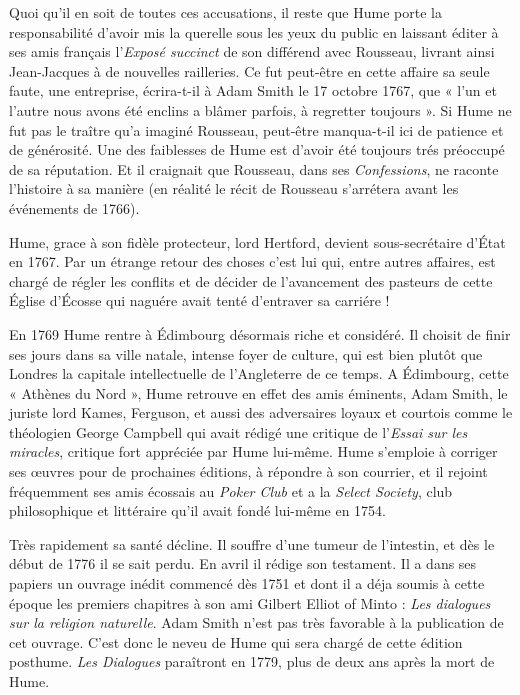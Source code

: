 Quoi qu’il en soit de toutes ces accusations, il
reste que Hume porte la responsabilité d’avoir mis
la querelle sous les yeux du public en laissant éditer
à ses amis français l’{\it Exposé succinct} de son différend
avec Rousseau, livrant ainsi Jean-Jacques à de
nouvelles railleries. Ce fut peut-être en cette affaire
sa seule faute, une entreprise, écrira-t-il à Adam
Smith le 17 octobre 1767, que « l’un et l’autre nous
avons été enclins a blâmer parfois, à regretter
toujours ». Si Hume ne fut pas le traître qu’a imaginé
Rousseau, peut-être manqua-t-il ici de patience et
de générosité. Une des faiblesses de Hume est d’avoir
été toujours trés préoccupé de sa réputation. Et
il craignait que Rousseau, dans ses {\it Confessions}, ne
raconte l'histoire à sa manière (en réalité le récit de
Rousseau s’arrétera avant les événements de 1766).

Hume, grace à son fidèle protecteur, lord Hertford,
devient sous-secrétaire d’État en 1767. Par un
étrange retour des choses c’est lui qui, entre autres
affaires, est chargé de régler les conflits et de décider
de l’avancement des pasteurs de cette Église
d’Écosse qui naguére avait tenté d’entraver sa
carriére !

En 1769 Hume rentre à Édimbourg désormais
riche et considéré. Il choisit de finir ses jours dans
sa ville natale, intense foyer de culture, qui est bien
plutôt que Londres la capitale intellectuelle de
l’Angleterre de ce temps. A Édimbourg, cette
« Athènes du Nord », Hume retrouve en effet des
amis éminents, Adam Smith, le juriste lord Kames,
Ferguson, et aussi des adversaires loyaux et courtois
comme le théologien George Campbell qui avait
rédigé une critique de l’{\it Essai sur les miracles}, critique
fort appréciée par Hume lui-même. Hume
s’emploie à corriger ses {\oe}uvres pour de prochaines
éditions, à répondre à son courrier, et il rejoint
fréquemment ses amis écossais au {\it Poker Club} et a
la {\it Select Society}, club philosophique et littéraire
qu’il avait fondé lui-même en 1754.

Très rapidement sa santé décline. Il souffre d’une
tumeur de l'intestin, et dès le début de 1776 il se
sait perdu. En avril il rédige son testament. Il a
dans ses papiers un ouvrage inédit commencé
dès 1751 et dont il a déja soumis à cette époque les
premiers chapitres à son ami Gilbert Elliot of Minto :
{\it Les dialogues sur la religion naturelle}. Adam Smith
n'est pas très favorable à la publication de cet
ouvrage. C’est donc le neveu de Hume qui sera
chargé de cette édition posthume. {\it Les Dialogues}
paraîtront en 1779, plus de deux ans après la mort
de Hume.

